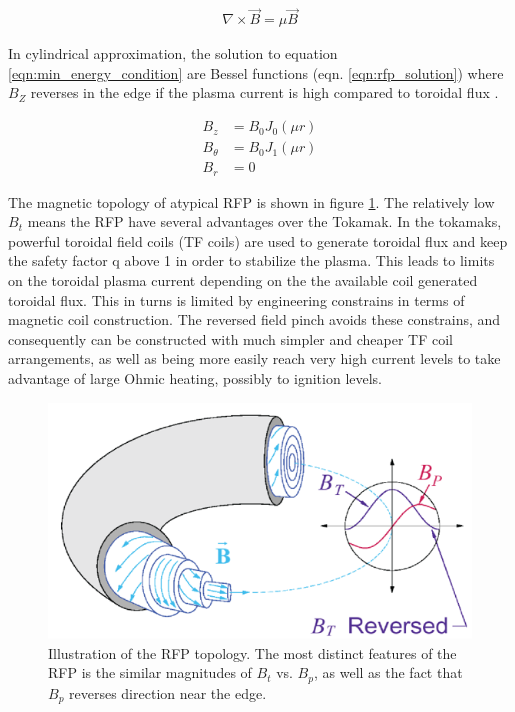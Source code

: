 \begin{refsection}
\begin{align}\label{eqn:min_energy_condition}
    \nabla \times \vec{B} = \mu \vec{B}
\end{align}

In cylindrical approximation, the solution to equation \ref{eqn:min_energy_condition} are Bessel functions (eqn. \ref{eqn:rfp_solution}) where $B_Z$ reverses in the edge if the plasma current is high compared to toroidal flux \cite{Taylor1974}.

\begin{align}\label{eqn:rfp_solution}
B_z &= B_0J_0(\mu r)\\
B_\theta &= B_0 J_1(\mu r)\\
B_r & = 0
\end{align}

The magnetic topology of atypical RFP is shown in figure \ref{fig:RFP_geometry}. The relatively low $B_t$ means the RFP have several advantages over the Tokamak. In the tokamaks, powerful toroidal field coils (TF coils) are used to generate toroidal flux and keep the safety factor q above 1 in order to stabilize the plasma. This leads to limits on the toroidal plasma current depending on the the available coil generated toroidal flux. This in turns is limited by engineering constrains in terms of magnetic coil construction. The reversed field pinch avoids these constrains, and
consequently can be constructed with much simpler and cheaper TF coil arrangements, as well as being more easily reach very high current levels to take advantage of large Ohmic heating, possibly to ignition levels.

\begin{figure}[!htb]
	\centering
	\includegraphics[width = 1.\linewidth]{./1_Introduction/RFP_mag_geometry.png}
	\caption[RFP magnetic topology]{Illustration of the RFP topology. The most distinct features of the RFP is the similar magnitudes of $B_t$ vs. $B_p$, as well as the fact that $B_p$ reverses direction near the edge.}
	\label{fig:RFP_geometry}
\end{figure}%


\end{refsection}
